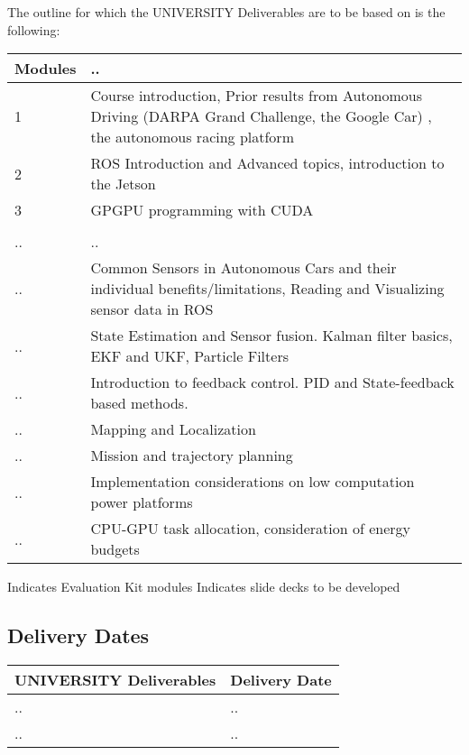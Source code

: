 \documentclass{article}[14pt]
\begin{document}
\pagebreak

The outline for which the UNIVERSITY Deliverables are to be based on is the following:

\begin{center}
\begin{tabular}{ | l || l |}
\hline
Modules & .. \\
\hline
1 & Course introduction, Prior results from Autonomous Driving (DARPA Grand Challenge, the Google Car) , the autonomous racing platform \\
\hline
2 & ROS Introduction and Advanced topics, introduction to the Jetson \\
\hline
3 & GPGPU programming with CUDA \\
 \\
\hline
.. & ..\\
\hline
.. & Common Sensors in Autonomous Cars and their individual benefits/limitations, Reading and Visualizing sensor data in ROS \\
\hline
..  & State Estimation and Sensor fusion. Kalman filter basics, EKF and UKF,  Particle Filters \\
\hline
.. & Introduction to feedback control. PID and State-feedback based methods. \\
\hline
.. & Mapping and Localization \\
\hline
.. & Mission and trajectory planning \\
\hline
.. & Implementation considerations on low computation power platforms \\
\hline 
.. & CPU-GPU task allocation, consideration of energy budgets \\
\hline
\end{tabular}
\end{center}

Indicates Evaluation Kit modules
Indicates slide decks to be developed

\subsection{Delivery Dates}
\begin{center}
\begin{tabular}{ | l | l |}
\hline
UNIVERSITY Deliverables & Delivery Date \\
\hline
.. & ..\\
\hline
.. & ..\\
\hline
\end{tabular}
\end{center}
\end{document}
